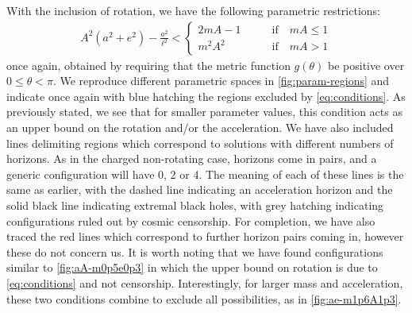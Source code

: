 \documentclass[
twoside,
openright,
frontopenright,
]{dmathesis}
\begin{document}
With the inclusion of rotation, we have the following parametric restrictions:
\begin{align}
  \label{eq:conditions}
  A^2(a^2+e^2)-\frac{a^2}{\ell^2} <
  \begin{cases}
    2mA - 1 \qquad &\mbox{if} \quad mA \leqslant 1\\
    m^2A^2 \qquad &\mbox{if} \quad mA > 1
  \end{cases}
\end{align}
once again, obtained by requiring that the metric function $g(\theta)$ be
positive over $0\leqslant\theta<\pi$. We reproduce different parametric spaces
in \cref{fig:param-regions} and indicate once again with blue hatching the
regions excluded by \cref{eq:conditions}. As previously stated, we see that for
smaller parameter values, this condition acts as an upper bound on the rotation
and/or the acceleration. We have also included lines delimiting regions which
correspond to solutions with different numbers of horizons. As in the charged
non-rotating case, horizons come in pairs, and a generic configuration will have
0, 2 or 4. The meaning of each of these lines is the same as earlier, with the
dashed line indicating an acceleration horizon and the solid black line
indicating extremal black holes, with grey hatching indicating configurations
ruled out by cosmic censorship. For completion, we have also traced the red
lines which correspond to further horizon pairs coming in, however these do not
concern us. It is worth noting that we have found configurations similar to
\cref{fig:aA-m0p5e0p3} in which the upper bound on rotation is due to
\cref{eq:conditions} and not censorship. Interestingly, for larger mass and
acceleration, these two conditions combine to exclude all possibilities, as in
\cref{fig:ae-m1p6A1p3}. 
\end{document}
